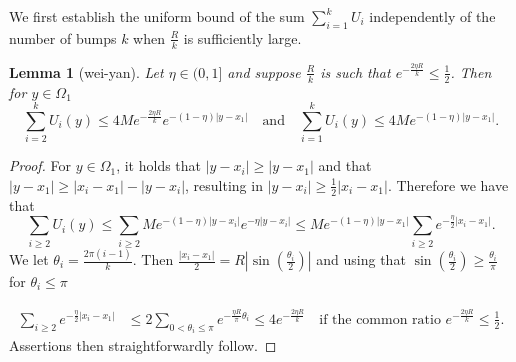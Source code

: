 \documentclass[a4paper,11pt]{article}
\def\blue{\color{blue}}
\def\blue{\color{blue}}
\newtheorem{lemma}{Lemma}[section]
\numberwithin{step}{dummy}
\begin{document}
We first establish the uniform bound of the sum $\displaystyle \sum_{i=1}^k U_i$ independently of the number of bumps $k$ when $\frac{R}{k}$ is sufficiently large. 
\begin{lemma}[{\blue wei-yan}] Let $\eta \in (0,1]$ and suppose $\frac{R}{k}$ is such that $e^{-\frac{2\eta R}{k}} \le \frac{1}{2}$. Then for $y \in{\Omega}_1$
$$\displaystyle \sum_{i=2}^k U_i(y) \le 4Me^{-\frac{2\eta R}{k}} e^{-(1-\eta)|y-x_1|} \quad\text{and} \quad \displaystyle \sum_{i=1}^k U_i(y) \le 4Me^{-(1-\eta)|y-x_1|}.$$
 \end{lemma}
\begin{proof}

For $y\in \Omega_1$, it holds that $|y-x_i|\ge |y-x_1|$ and that $|y-x_1| \ge |x_i-x_1|-|y-x_i|$, resulting in $|y-x_i|\ge \frac{1}{2}|x_i-x_1|$. Therefore we have that
$$\sum_{i\ge 2} U_i(y) \le \sum_{i\ge 2} Me^{-(1-\eta)|y-x_i|} e^{-\eta|y-x_i|}
\le Me^{-(1-\eta)|y-x_1|}\sum_{i\ge 2} e^{-\frac{\eta}{2}|x_i-x_1|} .$$
We let $\theta_i = \frac{2\pi(i-1)}{k}$. Then $ \frac{|x_i-x_1|}{2} = R\left|\sin\left(\frac{\theta_i}{2}\right)\right|$ and using that $ \sin\left(\frac{\theta_i}{2}\right) \ge \frac{\theta_i}{\pi}$ for $\theta_i \le \pi$

\begin{align*}
 \sum_{i\ge 2} e^{-\frac{\eta}{2}|x_i-x_1|} &\le 2\sum_{0<\theta_i \le \pi} e^{-\frac{\eta R}{\pi}\theta_i} \le 4 e^{-\frac{2\eta R}{k}} \quad \text{if the common ratio $e^{-\frac{2\eta R}{k}} \le \frac{1}{2}$}.
\end{align*}
Assertions then straightforwardly follow.
 \end{proof}
\end{document}
